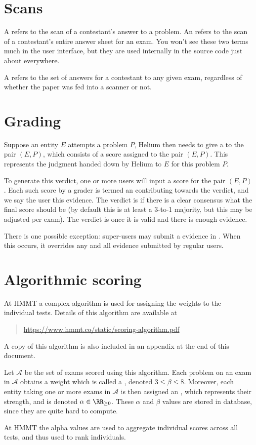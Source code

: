 \section{Scans}
A  refers to the scan
of a contestant's answer to a problem.
An  refers to the scan
of a contestant's entire answer sheet for an exam.
You won't see these two terms much in the user interface,
but they are used internally in the source code just about everywhere.

A  refers to the set of answers for
a contestant to any given exam,
regardless of whether the paper was fed into a scanner or not.

\section{Grading}
Suppose an entity $E$ attempts a problem $P$,
Helium then needs to give a  to the pair $(E,P)$,
which consists of a score assigned to the pair $(E,P)$.
This represents the judgment handed down by Helium to $E$
for this problem $P$.

To generate this verdict,
one or more users will input a score for the pair $(E,P)$.
Each such score by a grader is termed an 
contributing towards the verdict,
and we say the user  this evidence.
The verdict is  if there is a clear consensus what the final
score should be (by default this is at least a 3-to-1 majority,
but this may be adjusted per exam).
The verdict is  once it is valid and there is enough evidence.

There is one possible exception:
super-users may submit a evidence in .
When this occurs, it overrides any and all evidence submitted by regular users.

\section{Algorithmic scoring}
At HMMT a complex algorithm is used for assigning
the weights to the individual tests.
Details of this algorithm are available at
\begin{quote}
	\url{https://www.hmmt.co/static/scoring-algorithm.pdf}
\end{quote}
A copy of this algorithm is also included in an appendix
at the end of this document.

Let $\mathcal A$ be the set of exams scored using this algorithm.
Each problem on an exam in $\mathcal A$
obtains a weight which is called a ,
denoted $3 \le \beta \le 8$.
Moreover, each entity taking one or more exams in $\mathcal A$
is then assigned an ,
which represents their strength, and is denoted $\alpha \in \RR_{\ge 0}$.
These $\alpha$ and $\beta$ values are stored in database,
since they are quite hard to compute.

At HMMT the alpha values are used to aggregate individual scores
across all tests, and thus used to rank individuals.
